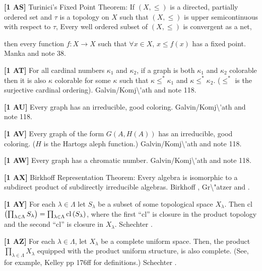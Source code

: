 \smallskip
\item{}{\bf [1 AS]} Turinici's Fixed Point Theorem:  If $(X,\le)$ is a
directed, partially ordered set and $\tau$ is a topology on $X$ such
that
 $(X,\le)$ is upper semicontinuous with respect to $\tau$,
 Every well ordered subset of $(X,\le)$ is convergent as a
net, \par
\item{}then every function $f:X\to X$ such that $\forall x\in X$,
$x\le f(x)$ has a fixed point. \ac{Manka} \cite{1988b} and note 38.
\smallskip
\item{}{\bf [1 AT]} For all cardinal numbers $\kappa_1$ and $\kappa_2$,
if a graph is both $\kappa_1$ and $\kappa_2$ colorable then it is also
$\kappa$ colorable for some $\kappa$ such that $\kappa\le^*\kappa_1$ and
$\kappa\le^*\kappa_2$. ($\le^*$ is the surjective cardinal ordering).
\ac{Galvin/Komj\'ath} \cite{1991} and note 118.
\smallskip
\item{}{\bf [1 AU]} Every graph has an irreducible, good coloring.
\ac{Galvin/Komj\'ath} \cite{1991} and note 118.
\smallskip
\item{}{\bf [1 AV]} Every graph of the form $G(A,H(A))$ has an irreducible,
good coloring.  ($H$ is the Hartogs aleph function.)
\ac{Galvin/Komj\'ath} \cite{1991} and note 118.
\smallskip
\item{}{\bf [1 AW]}  Every graph has a chromatic number.
\ac{Galvin/Komj\'ath} \cite{1991} and note 118.
\smallskip
\item{}{\bf [1 AX]} Birkhoff Representation Theorem: Every algebra is
isomorphic to a subdirect product of subdirectly irreducible algebras.
\ac{Birkhoff} \cite{1944}, \ac{Gr\"atzer} \cite{1979} and \cite{1986}.
\smallskip
\item{}{\bf [1 AY]} For each $\lambda\in\Lambda$ let $S_\lambda$ be a
subset of some topological space $X_\lambda$. Then cl$\left(\prod_
{\lambda\in\Lambda}S_\lambda\right)=\prod_{\lambda\in\Lambda}\hbox{cl}
\left(S_{\lambda}\right)$, where the first ``cl'' is closure in the product
topology and the second ``cl'' is closure in $X_\lambda$. \ac{Schechter}
\cite{1992}.
\smallskip
\item{}{\bf [1 AZ]} For each $\lambda\in\Lambda$, let $X_\lambda$ be a
complete uniform space. Then, the product $\prod_{\lambda\in\Lambda}
X_\lambda$ equipped with the product uniform structure, is also complete.
(See, for example, \ac{Kelley} \cite{1955} pp 176ff for definitions.)
\ac{Schechter} \cite{1992}.
